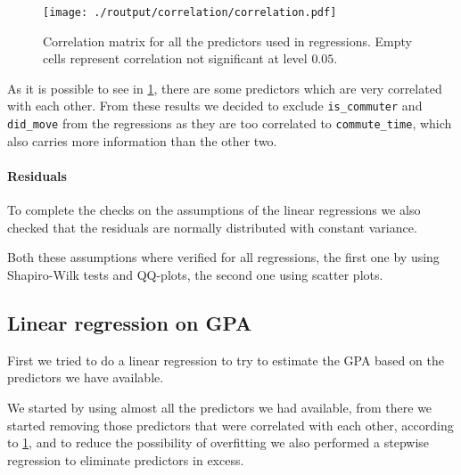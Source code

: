\documentclass[11pt]{extarticle}
\numberwithin{table}{section}
\numberwithin{figure}{section}
\numberwithin{equation}{section}
\begin{document}
\begin{figure}[!ht]
	\centering
	\texttt{[image: ./routput/correlation/correlation.pdf]}
	\caption{
		Correlation matrix for all the predictors used in regressions.
		Empty cells represent correlation not significant at level $0.05$.
	}
	\label{fig:corr}
\end{figure}

As it is possible to see in \cref{fig:corr}, there are some predictors which
are very correlated with each other.
From these results we decided to exclude \texttt{is\_commuter} and \texttt{did\_move}
from the regressions as they are too correlated to \texttt{commute\_time},
which also carries more information than the other two.

\paragraph{Residuals}
To complete the checks on the assumptions of the linear regressions
we also checked that the residuals are normally distributed with constant variance.

Both these assumptions where verified for all regressions,
the first one by using Shapiro-Wilk tests and QQ-plots, the second one using scatter plots.


\subsection{Linear regression on GPA}

First we tried to do a linear regression to try to estimate the GPA
based on the predictors we have available.

We started by using almost all the predictors we had available,
from there we started removing those predictors that were correlated with each other,
according to \cref{fig:corr}, and to reduce the possibility of overfitting
we also performed a stepwise regression to eliminate predictors in excess.
\end{document}
